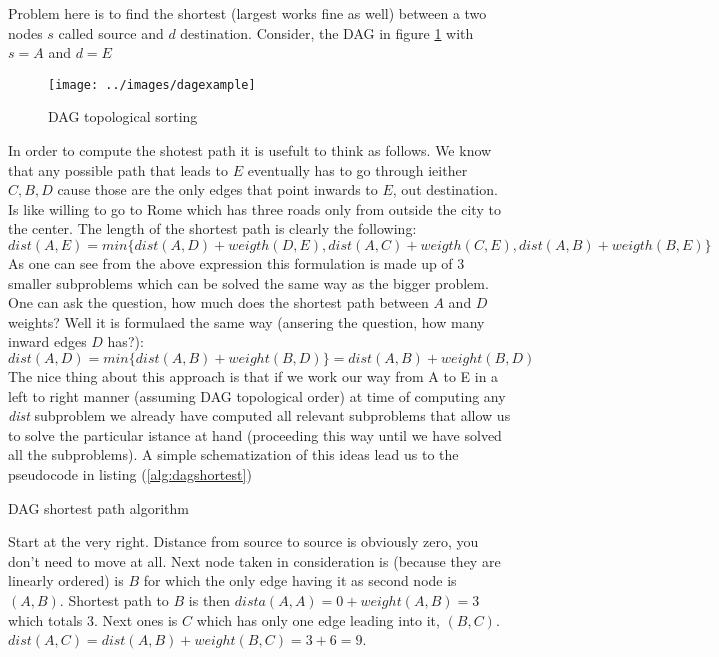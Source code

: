 Problem here is to find the shortest (largest works fine as well) between a two nodes $s$ called source and $d$ destination.
Consider, the DAG in figure \ref{fig:dagexample} with $s=A$ and $d=E$
	\begin{figure}
	\label{fig:dagexample}
	\centering
	\texttt{[image: ../images/dagexample]}
	\caption{DAG topological sorting}
	\end{figure}
In order to compute the shotest path it is usefult to think as follows. We know that any possible path that leads to $E$ eventually has to go through ieither $C,B,D$ cause those are the only edges that point inwards to $E$, out destination.
Is like willing to go to Rome which has three roads only  from outside the city to the center.
The length of the shortest path is clearly the following:
\[
	dist(A,E) = min\{dist(A,D)+weigth(D,E), dist(A,C)+weigth(C,E), dist(A,B)+weigth(B,E)\}
\]
As one can see from the above expression this formulation is made up of 3 smaller subproblems which can be solved the same way as the bigger problem.
One can ask the question, how much does the shortest path between $A$ and $D$ weights? Well it is formulaed the same way (ansering the question, how many inward edges $D$ has?):
\[
dist(A,D) = min\{dist(A,B) + weight(B,D)\} = dist(A,B) + weight(B,D)
\]
The nice thing about this approach is that if we work our way from A to E in a left to right manner (assuming DAG topological order) at time of computing any \textit{dist} subproblem we already have computed all relevant subproblems that allow us to solve the particular istance at hand (proceeding this way until we have solved all the subproblems).
A simple schematization of this ideas lead us to the pseudocode in listing (\ref{alg:dagshortest})
\begin{algorithm}\label{alg:dagshortest}
\caption{DAG shortest path algorithm}
\end{algorithm}
Start at the very right. Distance from source to source is obviously zero, you don't need to move at all. 
Next node taken in consideration is (because they are linearly ordered) is $B$ for which the only edge having it as second node is $(A,B)$. Shortest path to 
$B$ is then $dista(A,A)=0 + weight(A,B) =3$ which totals $3$. Next ones is $C$ which has only one edge leading into it, $(B,C)$. $dist(A,C) = dist(A,B) + weight(B,C) = 3+6=9$.
